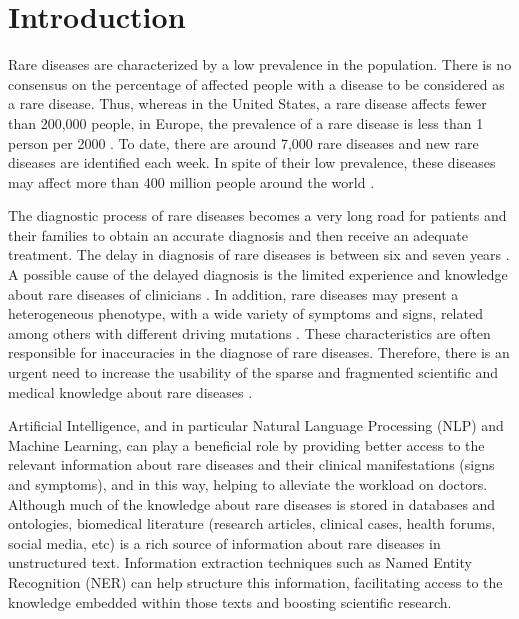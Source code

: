 \documentclass[preprint,12pt]{elsarticle}
\begin{document}

\section{Introduction}
\label{sec:introduction}
Rare diseases are characterized by a low prevalence in the population. There is no consensus on the percentage of affected people with a disease to be considered as a rare disease. Thus, whereas in the United States, a rare disease affects fewer than 200,000 people, in Europe, the prevalence of a rare disease is less than 1 person per 2000   \cite{paz2010rare}. 
To date, there are around 7,000 rare diseases and new rare diseases are identified each week. In spite of their low prevalence, these diseases may affect more than 400 million people around the world  \cite{klimova2017global,ferreira2019burden}. 

The diagnostic process of rare diseases becomes a very long road for patients and their families to obtain an accurate diagnosis and then receive an adequate treatment. The delay in diagnosis of rare diseases is between six and seven years    \cite{zurynski2017australian}. A possible cause of the delayed diagnosis is the limited experience and knowledge about rare diseases of clinicians  \cite{ts2011general,domaradzki2019medical,elliott2015rare}. In addition, rare diseases may present a heterogeneous phenotype, with a wide variety of symptoms and signs, related among others with different driving mutations   \cite{moliner2010creating}. 
These characteristics are often responsible for inaccuracies in the diagnose of rare diseases. 
 Therefore, there is an urgent need to increase the usability of the sparse and fragmented  scientific and medical knowledge about rare diseases \cite{haendel2020many}. 

Artificial Intelligence, and in particular Natural Language Processing (NLP) and Machine Learning, can play a beneficial role by
providing better access to the relevant information about rare diseases and their clinical manifestations (signs and symptoms), and in this way, helping to alleviate the workload on doctors. Although much of the knowledge about rare diseases is stored in databases and ontologies, biomedical literature (research articles, clinical cases, health forums, social media, etc) is a rich source of information about rare diseases in unstructured text. Information extraction techniques such as Named Entity Recognition (NER) can help structure this information, facilitating  access to the knowledge embedded within those texts and boosting scientific research. 
\end{document}
